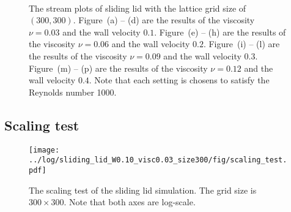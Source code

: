\begin{figure}[tb]
\begin{center}
    \\
    \caption{The stream plots of sliding lid
    with the lattice grid size of $(300, 300)$.
    Figure~(a) -- (d) are the results of 
    the viscosity $\nu = 0.03$ and the wall velocity $0.1$.
    Figure~(e) -- (h) are the results of 
    the viscosity $\nu = 0.06$ and the wall velocity $0.2$.
    Figure~(i) -- (l) are the results of 
    the viscosity $\nu = 0.09$ and the wall velocity $0.3$.
    Figure~(m) -- (p) are the results of 
    the viscosity $\nu = 0.12$ and the wall velocity $0.4$.
    Note that each setting is chosens to satisfy
    the Reynolds number 1000.
      \label{fig:sliding-lid-velocity-evolution}}
  \end{center}
\end{figure}

\subsection{Scaling test}
\begin{figure}
  \centering
  \texttt{[image: ../log/sliding\_lid\_W0.10\_visc0.03\_size300/fig/scaling\_test.pdf]}
  \caption{The scaling test of the sliding lid simulation.
  The grid size is $300 \times 300$.
  Note that both axes are log-scale.
  }
  \label{fig:sliding-lid-scaling}
\end{figure}

